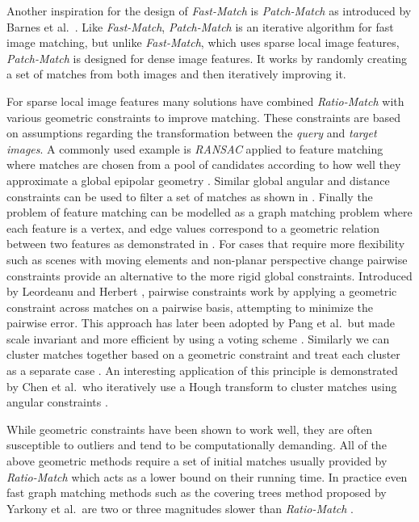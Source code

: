 \documentclass[runningheads]{llncs}
\begin{document}
Another inspiration for the design of \emph{Fast-Match} is \emph{Patch-Match} as introduced by Barnes et al.~\cite{barnes2009patchmatch}. Like \emph{Fast-Match}, \emph{Patch-Match} is an iterative algorithm for fast image matching, but unlike \emph{Fast-Match}, which uses sparse local image features, \emph{Patch-Match} is designed for dense image features. It works by randomly creating a set of matches from both images and then iteratively improving it.

For sparse local image features many solutions have combined \emph{Ratio-Match} with various geometric constraints to improve matching. These constraints are based on assumptions regarding the transformation between the \emph{query} and \emph{target images}. A commonly used example is \emph{RANSAC} applied to feature matching where matches are chosen from a pool of candidates according to how well they approximate a global epipolar geometry \cite{fischler1981ransac,torr2000mlesac,szeliski2010}. Similar global angular and distance constraints can be used to filter a set of matches as shown in \cite{kim2008efficient,schmid1997local}. Finally the problem of feature matching can be modelled as a graph matching problem where each feature is a vertex, and edge values correspond to a geometric relation between two features as demonstrated in \cite{torresani2008feature,yarkony2010covering,cho2010reweighted}. For cases that require more flexibility such as scenes with moving elements and non-planar perspective change pairwise constraints provide an alternative to the more rigid global constraints. Introduced by Leordeanu and Herbert \cite{leordeanu2005spectral}, pairwise constraints work by applying a geometric constraint across matches on a pairwise basis, attempting to minimize the pairwise error. This approach has later been adopted by Pang et al.\ but made scale invariant and more efficient by using a voting scheme \cite{yuan2012efficient,pang2012scale}. Similarly we can cluster matches together based on a geometric constraint and treat each cluster as a separate case \cite{cho2009feature,wu2011robust}. An interesting application of this principle is demonstrated by Chen et al.\ who iteratively use a Hough transform to cluster matches using angular constraints \cite{chen2013robust}.

While geometric constraints have been shown to work well, they are often susceptible to outliers and tend to be computationally demanding. All of the above geometric methods require a set of initial matches usually provided by \emph{Ratio-Match} which acts as a lower bound on their running time. In practice even fast graph matching methods such as the covering trees method proposed by Yarkony et al.\ are two or three magnitudes slower than \emph{Ratio-Match} \cite{yarkony2010covering}.
\end{document}
